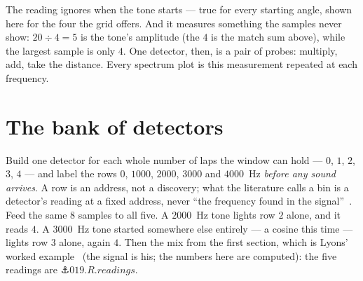 \begin{narrative}
\begin{center}
\end{center}

\noindent The reading ignores when the tone starts — true for every
starting angle, shown here for the four the grid offers. And it measures
something the samples never show: $20 \div 4 = 5$ is the tone's
amplitude (the $4$ is the match sum above), while the largest sample is
only $4$. One detector, then, is a pair of probes: multiply, add, take
the distance. Every spectrum plot is this measurement repeated at each
frequency.

\section{The bank of detectors}

Build one detector for each whole number of laps the window can hold —
$0$, $1$, $2$, $3$, $4$ — and label the rows $0$, $1000$, $2000$,
$3000$ and $4000$~Hz \emph{before any sound arrives}. A row is an
address, not a discovery; what the literature calls a bin is a
detector's reading at a fixed address, never ``the frequency found in
the signal''~\cite{signal_processing-j-o-smith-mdft-spectral-bin-numbers}.
Feed the same $8$ samples to all five. A $2000$~Hz tone lights row $2$
alone, and it reads $4$. A $3000$~Hz tone started somewhere else
entirely — a cosine this time — lights row $3$ alone, again $4$. Then
the mix from the first section, which is Lyons' worked
example~\cite{signal_processing-lyons-understanding-dsp-3rd-ed-contents}
(the signal is his; the numbers here are computed): the five readings
are $\anchor{019.R.readings}$.


\end{narrative}
